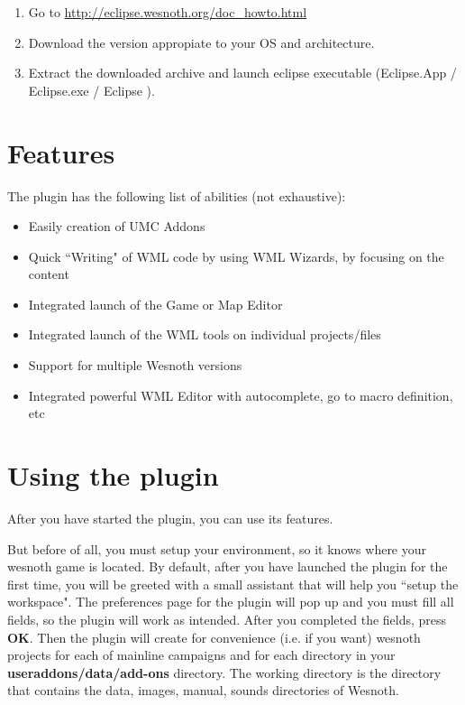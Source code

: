 \documentclass[10pt]{article}
\begin{document}
\begin{enumerate}
  \item Go to \href{http://eclipse.wesnoth.org/doc\_howto.html}{http://eclipse.wesnoth.org/doc\_howto.html}
  \item Download the version appropiate to your OS and architecture.
  \item Extract the downloaded archive and launch eclipse executable (Eclipse.App / Eclipse.exe / Eclipse ).
\end{enumerate}

\section{Features}

The plugin has the following list of abilities (not exhaustive):
\begin{itemize}
  \item Easily creation of UMC Addons
  \item Quick ``Writing" of WML code by using WML Wizards, by focusing on the content
  \item Integrated launch of the Game or Map Editor
  \item Integrated launch of the WML tools on individual projects/files
  \item Support for multiple Wesnoth versions
  \item Integrated powerful WML Editor with autocomplete, go to macro definition, etc
\end{itemize}

\section{Using the plugin}
After you have started the plugin, you can use its features.

But before of all, you must setup your environment, so it knows where your wesnoth game is located. By default, after you have launched the plugin for the first time, you will be greeted with a small assistant that will help you ``setup the workspace". The preferences page for the plugin will pop up and you must fill all fields, so the plugin will work as intended. After you completed the fields, press \textbf{OK}. Then the plugin will create for convenience (i.e. if you want) wesnoth projects for each of mainline campaigns and for each directory in your \textbf{useraddons/data/add-ons} directory. The working directory is the directory that contains the data, images, manual, sounds directories of Wesnoth.
\end{document}
